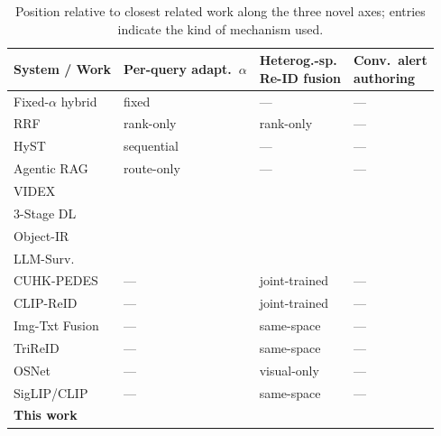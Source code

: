 ﻿\documentclass[conference]{IEEEtran}
\theoremstyle{definition}
\newcommand{\cmark}{\ding{51}}
\newcommand{\xmark}{\ding{55}}
\begin{document}
\begin{table}[!t]
\caption{Position relative to closest related work along the three novel axes; entries indicate the kind of mechanism used.}
\label{tab:related}
\centering
\scriptsize
\setlength{\tabcolsep}{3pt}
\begin{tabular}{@{}p{2.6cm}p{1.25cm}p{1.45cm}p{1.05cm}@{}}
\toprule
System / Work & \makecell[l]{Per-query\\ adapt.\ $\alpha$} & \makecell[l]{Heterog.-sp.\\ Re-ID fusion} & \makecell[l]{Conv.\ alert\\ authoring} \\
\midrule
Fixed-$\alpha$ hybrid~\cite{b29}     & fixed       & ---            & --- \\
RRF~\cite{b27}                        & rank-only   & rank-only      & --- \\
HyST~\cite{b30}                       & sequential  & ---            & --- \\
Agentic RAG~\cite{b3}                 & route-only  & ---            & --- \\
VIDEX~\cite{b7}                       & \xmark      & \xmark         & \xmark \\
3-Stage DL~\cite{b12}                 & \xmark      & \xmark         & \xmark \\
Object-IR~\cite{b11}                  & \xmark      & \xmark         & \xmark \\
LLM-Surv.~\cite{b1}                   & \xmark      & \xmark         & \xmark \\
CUHK-PEDES~\cite{b32}                 & ---         & joint-trained  & --- \\
CLIP-ReID~\cite{b33}                  & ---         & joint-trained  & --- \\
Img-Txt Fusion~\cite{b34}             & ---         & same-space     & --- \\
TriReID~\cite{b35}                    & ---         & same-space     & --- \\
OSNet~\cite{b22b}                     & ---         & visual-only    & --- \\
SigLIP/CLIP~\cite{b24}                & ---         & same-space     & --- \\
\textbf{This work}                    & \cmark      & \cmark         & \cmark \\
\bottomrule
\end{tabular}
\end{table}
\end{document}
